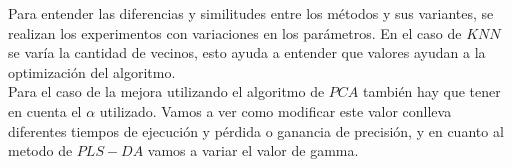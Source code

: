 Para entender las diferencias y similitudes entre los métodos y sus variantes, se realizan los experimentos con variaciones en los parámetros. En el caso de
$KNN$ se varía la cantidad de vecinos, esto ayuda a entender que valores ayudan a la optimización del algoritmo.
\\
Para el caso de la mejora utilizando el algoritmo de $PCA$ también hay que tener en cuenta el $\alpha$ utilizado. Vamos a ver como modificar este valor
conlleva diferentes tiempos de ejecución y pérdida o ganancia de precisión, y en cuanto al metodo de $PLS-DA$  vamos a variar el valor de gamma.


